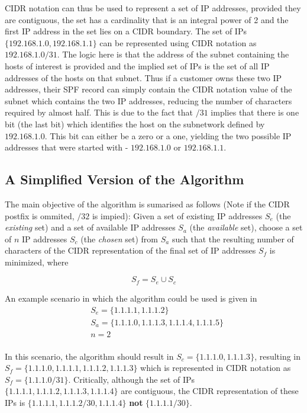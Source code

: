 CIDR notation can thus be used to represent a set of IP addresses, provided they are contiguous, the set has a cardinality that is an integral power of 2 and the first IP address in the set lies on a CIDR boundary. The set of IPs $\{192.168.1.0, 192.168.1.1\}$ can be represented using CIDR notation as $192.168.1.0/31$. The logic here is that the address of the subnet containing the hosts of interest is provided and the implied set of IPs is the set of all IP addresses of the hosts on that subnet.  Thus if a customer owns these two IP addresses, their SPF record can simply contain the CIDR notation value of the subnet which contains the two IP addresses, reducing the number of characters required by almost half. This is due to the fact that $/31$ implies that there is one bit (the last bit) which identifies the host on the subnetwork defined by $192.168.1.0$. This bit can either be a zero or a one, yielding the two possible IP addresses that were started with - $192.168.1.0$ or $192.168.1.1$.

\subsection{A Simplified Version of the Algorithm}
The main objective of the algorithm is sumarised as follows (Note if the CIDR postfix is ommited, $/32$ is impied): \hfill\break\break
Given a set of existing IP addresses $S_e$ (the \textit{existing} set) and a set of available IP addresses $S_a$ (the \textit{available} set), choose a set of $n$ IP addresses $S_c$ (the \textit{chosen} set) from $S_a$ such that the resulting number of characters of the CIDR representation of the final set of IP addresses $S_f$ is minimized, where 

\begin{equation}
S_f = S_e \cup S_c
\end{equation}

An example scenario in which the algorithm could be used is given in 
\begin{equation}\label{eq:ipAlgExample}
\begin{split}
 &   S_e = \{1.1.1.1, 1.1.1.2\} \\
 &   S_a = \{1.1.1.0, 1.1.1.3, 1.1.1.4, 1.1.1.5\} \\
 &   n = 2 \\
\end{split}
\end{equation}

In this scenario, the algorithm should result in $S_c = \{1.1.1.0, 1.1.1.3\}$, resulting in $S_f = \{1.1.1.0, 1.1.1.1, 1.1.1.2, 1.1.1.3\}$ which is represented in CIDR notation as $S_f = \{1.1.1.0/31\}$. Critically, although the set of IPs $\{1.1.1.1, 1.1.1.2, 1.1.1.3, 1.1.1.4\}$ are contiguous, the CIDR representation of these IPs is $\{1.1.1.1, 1.1.1.2/30, 1.1.1.4\}$ \textbf{not} $\{1.1.1.1/30\}$.

